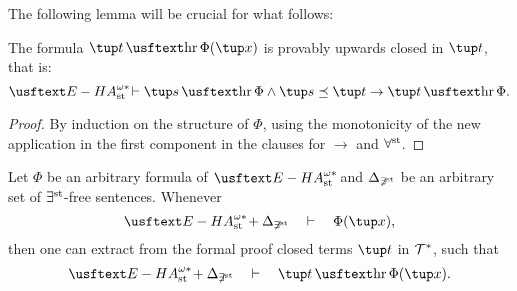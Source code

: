 The following lemma will be crucial for what follows:

\begin{lemma}\label{l:hrealizersext} The formula $\tup t \hr \Phi(\tup x)$ is provably upwards closed in $\tup t$, that is: 
\[ \ehaststar \vdash \tup s\hr\Phi \land \tup s \preceq \tup t \to \tup t\hr\Phi. \]
\end{lemma}
\begin{proof}
By induction on the structure of $\Phi$, using the monotonicity of the new application in the first component in the clauses for $\to$ and $\forall^{\operatorname{st}{}}\!$.
\end{proof}

\begin{thm}
Let $\Phi$ be an arbitrary formula of $\ehaststar$ and $\Delta_{\not\exists^{\operatorname{st}}}$ be an arbitrary set of $\exists^{\operatorname{st}{}}\!$-free sentences. Whenever
\[\ehaststar + \Delta_{\not\exists^{\st}} \quad \vdash\quad\Phi(\tup x),\]
then one can extract from the formal proof closed terms $\tup t$ in $\mathcal{T}^*$, such that
\[\ehaststar + \Delta_{\not\exists^{\st}} \quad\vdash\quad \tup t \hr \Phi(\tup x).\]
\end{thm}
